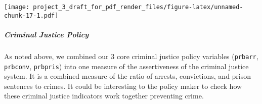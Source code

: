 \documentclass[]{article}
\newenvironment{Shaded}{\begin{snugshade}}{\end{snugshade}}
\newcommand{\DataTypeTok}[1]{\textcolor[rgb]{0.13,0.29,0.53}{#1}}
\newcommand{\DecValTok}[1]{\textcolor[rgb]{0.00,0.00,0.81}{#1}}
\newcommand{\KeywordTok}[1]{\textcolor[rgb]{0.13,0.29,0.53}{\textbf{#1}}}
\newcommand{\NormalTok}[1]{#1}
\newcommand{\OperatorTok}[1]{\textcolor[rgb]{0.81,0.36,0.00}{\textbf{#1}}}
\newcommand{\StringTok}[1]{\textcolor[rgb]{0.31,0.60,0.02}{#1}}
\let\oldsubparagraph\subparagraph
\renewcommand{\subparagraph}[1]{\oldsubparagraph{#1}\mbox{}}
\begin{document}
\begin{Shaded}
\end{Shaded}

\texttt{[image: project\_3\_draft\_for\_pdf\_render\_files/figure-latex/unnamed-chunk-17-1.pdf]}

\hypertarget{criminal-justice-policy-1}{%
\subparagraph{Criminal Justice Policy}\label{criminal-justice-policy-1}}

As noted above, we combined our 3 core criminal justice policy variables
(\texttt{prbarr}, \texttt{prbconv}, \texttt{prbpris}) into one measure
of the assertiveness of the criminal justice system. It is a combined
measure of the ratio of arrests, convictions, and prison sentences to
crimes. It could be interesting to the policy maker to check how these
criminal justice indicators work together preventing crime.
\end{document}
